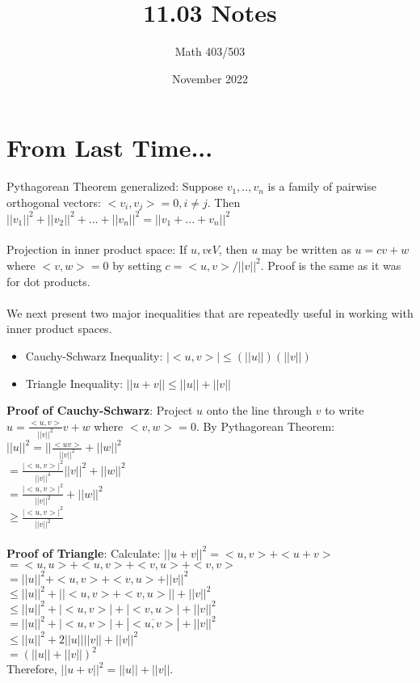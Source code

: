 \documentclass{article}
\title{11.03 Notes}
\author{Math 403/503}
\date{November 2022}
\begin{document}
\maketitle

\section{From Last Time...}
Pythagorean Theorem generalized: Suppose $v_1,..,v_n$ is a family of pairwise orthogonal vectors: $<v_i, v_j> = 0, i \neq j$. Then $||v_1||^2 + ||v_2||^2 + ... + ||v_n||^2 = ||v_1 + ... + v_n||^2$ \\\\
Projection in inner product space: If $u,v \epsilon V$, then $u$ may be written as $u = cv + w$ where $<v,w> = 0$ by setting $c = <u,v> / ||v||^2$. Proof is the same as it was for dot products. \\\\
We next present two major inequalities that are repeatedly useful in working with inner product spaces. 
\begin{itemize}
    \item Cauchy-Schwarz Inequality: $|<u,v>| \leq (||u||)(||v||)$
    \item Triangle Inequality: $||u+v|| \leq ||u|| + ||v||$
\end{itemize}
\textbf{Proof of Cauchy-Schwarz}: Project $u$ onto the line through $v$ to write $u = \frac{<u,v>}{||v||^2} v+w$ where $<v,w> = 0$. By Pythagorean Theorem: $||u||^2 = ||\frac{<uv>}{||v||^2} + ||w||^2 $\\
$= \frac{|<u,v>|^2}{||v||^4} ||v||^2 + ||w||^2$\\
$= \frac{|<u,v>|^2}{||v||^2} + ||w||^2$\\
$\geq \frac{|<u,v>|^2}{||v||^2}$\\\\
\textbf{Proof of Triangle}: Calculate: $||u+v||^2 = <u,v> + <u+v>$ \\
$ = <u,u> + <u,v> + <v,u> + <v,v>$\\
$ = ||u||^2 + <u,v> + <v,u> + ||v||^2$\\
$\leq ||u||^2 + ||<u,v> + <v,u>|| + ||v||^2$\\
$\leq ||u||^2 + |<u,v>| + |<v,u>| + ||v||^2$\\
$= ||u||^2 + |<u,v>| + |\overline{<u,v>}| + ||v||^2$\\
$\leq||u||^2 + 2||u|| ||v|| + ||v||^2$\\
$= (||u|| + ||v||) ^2$\\
Therefore, $||u+v||^2 = ||u|| + ||v||$. 
\end{document}
